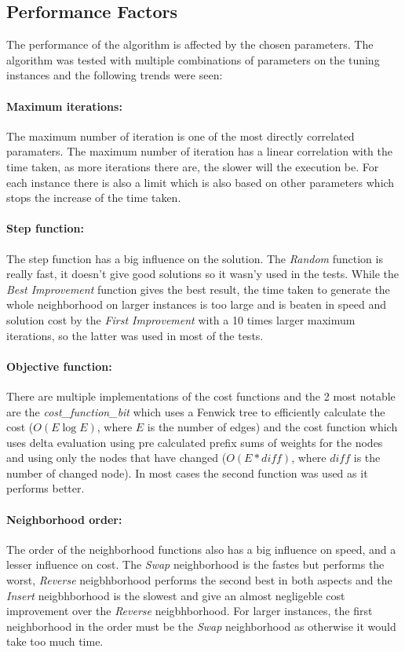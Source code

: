 \documentclass{article}
\begin{document}
\subsection*{Performance Factors}
The performance of the algorithm is affected by the chosen parameters. The algorithm was tested with multiple combinations of parameters on the tuning instances and the following trends were seen:

\paragraph{Maximum iterations:} 
The maximum number of iteration is one of the most directly correlated paramaters. The maximum number of iteration has a linear correlation with the time taken, as more iterations there are, the slower will the execution be. For each instance there is also a limit which is also based on other parameters which stops the increase of the time taken.

\paragraph{Step function:}
The step function has a big influence on the solution. The \textit{Random} function is really fast, it doesn't give good solutions so it wasn'y used in the tests. While the \textit{Best Improvement} function gives the best result, the time taken to generate the whole neighborhood on larger instances is too large and is beaten in speed and solution cost by the \textit{First Improvement} with a 10 times larger maximum iterations, so the latter was used in most of the tests.

\paragraph{Objective function:}
There are multiple implementations of the cost functions and the 2 most notable are the \textit{cost\_function\_bit} which uses a Fenwick tree to efficiently calculate the cost ($O(E \log E)$, where $E$ is the number of edges) and the cost function which uses delta evaluation using pre calculated prefix sums of weights for the nodes and using only the nodes that have changed ($O(E*diff)$, where $diff$ is the number of changed node). In most cases the second function was used as it performs better.

\paragraph{Neighborhood order:}
The order of the neighborhood functions also has a big influence on speed, and a lesser influence on cost. The \textit{Swap} neighborhood is the fastes but performs the worst, \textit{Reverse} neigbhborhood performs the second best in both aspects and the \textit{Insert} neigbhborhood is the slowest and give an almost negligeble cost improvement over the \textit{Reverse} neigbhborhood. For larger instances, the first neighborhood in the order must be the \textit{Swap} neighborhood as otherwise it would take too much time.
\end{document}
